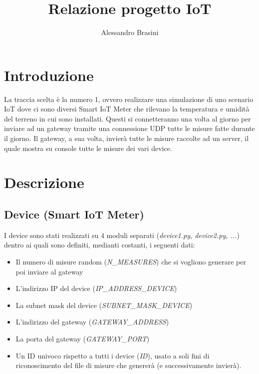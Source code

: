\documentclass[a4paper, 14pt]{extreport}
\title{Relazione progetto IoT}
\author{Alessandro Brasini}
\begin{document}
    \maketitle
    \tableofcontents

    \chapter{Introduzione}
    La traccia scelta è la numero 1, ovvero realizzare una simulazione di uno scenario IoT 
    dove ci sono diversi Smart IoT Meter che rilevano la temperatura e umidità del terreno in cui sono installati.
    Questi si connetteranno una volta al giorno per inviare ad un gateway tramite una connessione UDP tutte le
    misure fatte durante il giorno.
    Il gateway, a sua volta, invierà tutte le misure raccolte ad un server, il quale mostra su console tutte le misure
    dei vari device.

    \chapter{Descrizione}

    \section{Device (Smart IoT Meter)}
    I device sono stati realizzati su 4 moduli separati (\emph{device1.py, device2.py, ...})
    dentro ai quali sono definiti, medianti costanti, i seguenti dati:
    \begin{itemize}
        \item Il numero di misure random (\emph{N\_MEASURES}) che si vogliono generare per poi inviare al gateway
        \item L'indirizzo IP del device (\emph{IP\_ADDRESS\_DEVICE})
        \item La subnet mask del device (\emph{SUBNET\_MASK\_DEVICE})
        \item L'indirizzo del gateway (\emph{GATEWAY\_ADDRESS})
        \item La porta del gateway (\emph{GATEWAY\_PORT})
        \item Un ID univoco rispetto a tutti i device (\emph{ID}), usato a soli fini di riconoscimento
                del file di misure che genererà (e successivamente invierà).
    \end{itemize}
\end{document}
